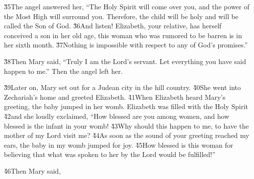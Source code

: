 \v{35}The angel answered her, ``The Holy Spirit will come over you, and the power of the Most High will surround you. Therefore, the child will be holy and will be called the Son of God. \v{36}And listen! Elizabeth, your relative, has herself conceived a son in her old age, this woman who was rumored to be barren is in her sixth month. \v{37}Nothing is impossible with respect to any of God's promises.''

\v{38}Then Mary said, ``Truly I am the Lord's servant. Let everything you have said happen to me.'' Then the angel left her.

\v{39}Later on, Mary set out for a Judean city in the hill country. \v{40}She went into Zechariah's home and greeted Elizabeth. \v{41}When Elizabeth heard Mary's greeting, the baby jumped in her womb. Elizabeth was filled with the Holy Spirit \v{42}and she loudly exclaimed, ``How blessed are you among women, and how blessed is the infant in your womb! \v{43}Why should this happen to me, to have the mother of my Lord visit me? \v{44}As soon as the sound of your greeting reached my ears, the baby in my womb jumped for joy. \v{45}How blessed is this woman for believing that what was spoken to her by the Lord would be fulfilled!''

\v{46}Then Mary said,

